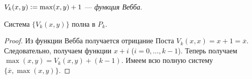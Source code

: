 \begin{definition}
    $V_k(x, y) \vcentcolon = \max(x, y) + 1$ --- \textit{функция Вебба}.
\end{definition}

\begin{theorem}
    Система $\{V_k(x, y)\}$ полна в $P_k$.
\end{theorem}

\begin{proof}
    Из функции Вебба получается отрицание Поста $V_k(x, x) = x + 1 = \overline{x}$. Следовательно, получаем функции $x + i$ ($i = 0, \ldots, k - 1$). Теперь получаем $\max(x, y) = V_k(x, y) + (k - 1)$. Имеем всю полную систему $\{\overline{x}, \max(x, y)\}$.
\end{proof}